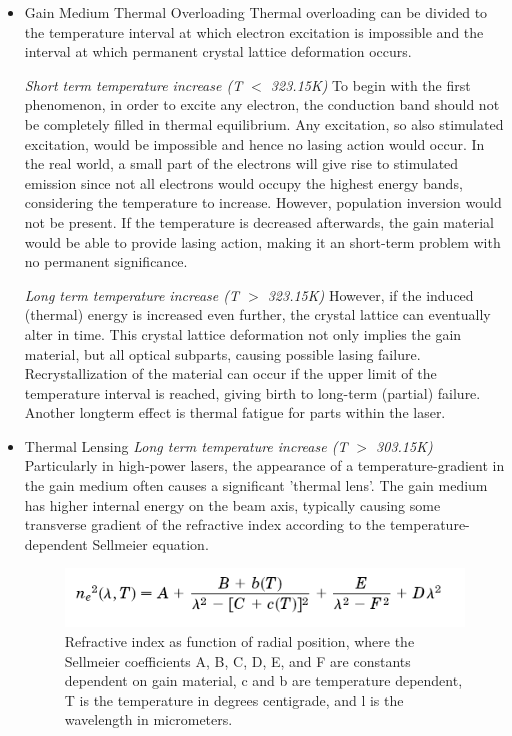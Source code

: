 \begin{itemize}
	\item Gain Medium Thermal Overloading
Thermal overloading can be divided to the temperature interval at which electron excitation is impossible and the interval at which permanent crystal lattice deformation occurs.

\textit{Short term temperature increase (T $<$ 323.15K)}
To begin with the first phenomenon, in order to excite any electron, the conduction band should not be completely filled in thermal equilibrium. Any excitation, so also stimulated excitation, would be impossible and hence no lasing action would occur. In the real world, a small part of the electrons will give rise to stimulated emission since not all electrons would occupy the highest energy bands, considering the temperature to increase. However, population inversion would not be present. If the temperature is decreased afterwards, the gain material would be able to provide lasing action, making it an short-term problem with no permanent significance. 

\textit{Long term temperature increase (T $>$ 323.15K)}
However, if the induced (thermal) energy is increased even further, the crystal lattice can eventually alter in time. This crystal lattice deformation not only implies the gain material, but all optical subparts, causing possible lasing failure. Recrystallization of the material can occur if the upper limit of the temperature interval is reached, giving birth to long-term (partial) failure. Another longterm effect is thermal fatigue for parts within the laser.
	
\item Thermal Lensing
\textit{Long term temperature increase (T $>$ 303.15K)}
Particularly in high-power lasers, the appearance of a temperature-gradient in the gain medium often causes a significant 'thermal lens'. The gain medium has higher internal energy on the beam axis, typically causing some transverse gradient of the refractive index according to the temperature-dependent Sellmeier equation. 

\begin{figure}[ht!]
	\begin{center}
\includegraphics[scale=0.5]{chapters/img/TISE.png}	
\caption{Refractive index as function of radial position, where the Sellmeier coefficients A, B, C, D, E, and F are constants dependent on gain material, c and b are temperature dependent, T is the temperature in degrees centigrade, and l is the wavelength in micrometers.}
\label{thermal_lensing}
\end{center}
\end{figure}


\end{itemize}
